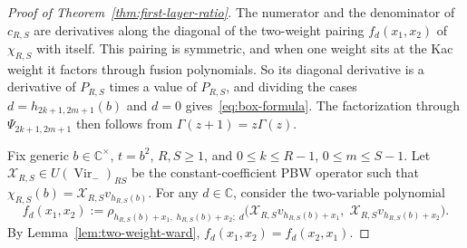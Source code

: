\documentclass[twoside,10pt]{article}
\numberwithin{equation}{section}
\theoremstyle{slbody}
\theoremstyle{definition}
\theoremstyle{remark}
\newcommand{\Vir}{\operatorname{Vir}}
\begin{document}
\begin{proof}[Proof of Theorem~\ref{thm:first-layer-ratio}]
The numerator and the denominator of \(c_{R,S}\) are derivatives along the
diagonal of the two-weight pairing \(f_d(x_1,x_2)\) of \(\chi_{R,S}\) with
itself.  This pairing is symmetric, and when one weight sits at the Kac weight
it factors through fusion polynomials.  So its diagonal derivative is a
derivative of \(P_{R,S}\) times a value of \(P_{R,S}\), and dividing the cases
\(d=h_{2k+1,2m+1}(b)\) and \(d=0\) gives~\eqref{eq:box-formula}.  The
factorization through \(\Psi_{2k+1,2m+1}\) then follows from
\(\Gamma(z+1)=z\Gamma(z)\).

Fix generic \(b\in\mathbb{C}^\times\), \(t=b^2\), \(R,S\geq1\), and
\(0\leq k\leq R-1\), \(0\leq m\leq S-1\).  Let \(\mathcal{X}_{R,S}\in U(\Vir_-)_{RS}\)
be the constant-coefficient PBW operator such that
\(\chi_{R,S}(b)=\mathcal{X}_{R,S}v_{h_{R,S}(b)}\).  For any \(d\in\mathbb{C}\),
consider the two-variable polynomial
\[
 f_d(x_1,x_2)
 :=\rho_{h_{R,S}(b)+x_1,\;h_{R,S}(b)+x_2;\;d}
   \bigl(\mathcal{X}_{R,S}v_{h_{R,S}(b)+x_1},\;
         \mathcal{X}_{R,S}v_{h_{R,S}(b)+x_2}\bigr).
\]
By Lemma~\ref{lem:two-weight-ward}, \(f_d(x_1,x_2)=f_d(x_2,x_1)\).


\end{proof}
\end{document}
